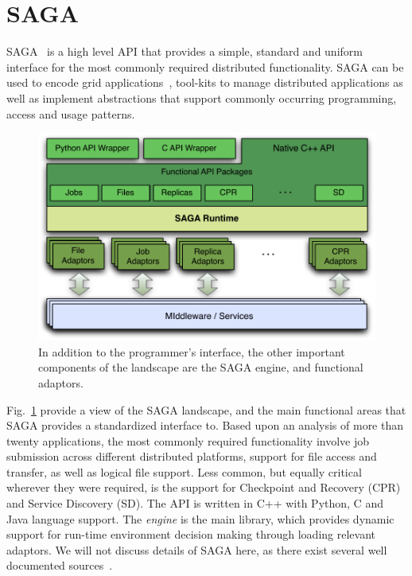 \documentclass[conference,final]{IEEEtran}
\begin{document}
\section{SAGA}
SAGA~\cite{saga-core} is a high level API that provides a simple,
standard and uniform interface for the most commonly required
distributed functionality.  SAGA can be used to encode grid
applications~\cite{saga_escience07_short, saga_tg08}, tool-kits to manage
distributed applications as well as implement abstractions that
support commonly occurring programming, access and usage patterns.

\begin{figure}[t]
\includegraphics[scale=0.5]{saga-figure02.pdf}
\caption{In addition to the programmer's interface,
  the other important components of the landscape are the SAGA engine,
  and functional adaptors.}
\label{saga_figure}
\end{figure}

Fig.~\ref{saga_figure} provide a view of the SAGA landscape, and the
main functional areas that SAGA provides a standardized interface
to. Based upon an analysis of more than twenty applications, the most
commonly required functionality involve job submission across
different distributed platforms, support for file access and transfer,
as well as logical file support. Less common, but equally critical
wherever they were required, is the support for Checkpoint and
Recovery (CPR) and Service Discovery (SD).  The API is written in C++
with Python, C and Java language support. The {\it engine} is the main
library, which provides dynamic support for run-time environment
decision making through loading relevant adaptors. We will not discuss
details of SAGA here, as there exist several well documented
sources~\cite{saga_url}.
\end{document}
